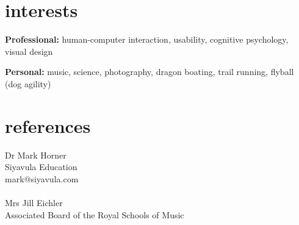\documentclass[]{friggeri-cv} %
\begin{document}

\section{interests}

\textbf{Professional:} human-computer interaction, usability, cognitive psychology, visual design

\textbf{Personal:} music, science, photography, dragon boating, trail running, flyball (dog agility)


\section{references}

Dr Mark Horner\\
Siyavula Education\\
mark@siyavula.com\\
\\

Mrs Jill Eichler\\
Associated Board of the Royal Schools of Music\\
\end{document}
